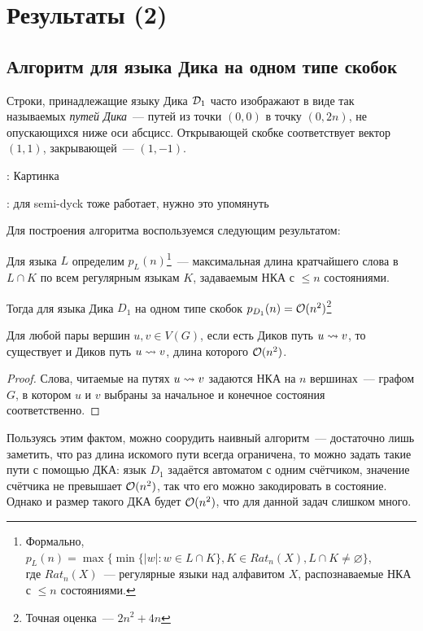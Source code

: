 \section{Результаты (2)}

\subsection{Алгоритм для языка Дика на одном типе скобок}

\begin{note}
  Строки, принадлежащие языку Дика $\mathcal{D}_1$ часто изображают в виде так называемых \textit{путей Дика}~--- путей из точки $(0, 0)$ в точку $(0, 2n)$, не опускающихся ниже оси абсцисс. Открывающей скобке соответствует вектор $(1, 1)$, закрывающей~--- $(1, -1)$.

  \TODO: Картинка 
\end{note}

\TODO: для semi-dyck тоже работает, нужно это упомянуть

Для построения алгоритма воспользуемся следующим результатом:

\begin{lemma}

Для языка $L$ определим $p_L(n)$\footnote{Формально, $p_L(n) = \max \{ \min \{|w| \colon w \in L \cap K \}, K \in Rat_n(X), L \cap K \ne \varnothing \}$,\\ где $Rat_n(X)$~--- регулярные языки над алфавитом $X$, распознаваемые НКА с $\le n$ состояниями.}~--- максимальная длина кратчайшего слова в $L \cap K$ по всем регулярным языкам $K$, задаваемым НКА с $\le n$ состояниями.

Тогда для языка Дика $D_1$ на одном типе скобок $p_{D_1}(n) = \mathcal{O}(n^2)$\footnote{Точная оценка~--- $2n^2 + 4n$}
\end{lemma}

\begin{corollary}
    Для любой пары вершин $u, v \in V(G)$, если есть Диков путь $u \rightsquigarrow v$, то существует и Диков путь $u \rightsquigarrow v$, длина которого $\mathcal{O}(n^2)$.
\end{corollary}
\begin{proof}
    Слова, читаемые на путях $u \rightsquigarrow v$ задаются НКА на $n$ вершинах~--- графом $G$, в котором $u$ и $v$ выбраны за начальное и конечное состояния соответственно.
\end{proof}

\begin{note}
Пользуясь этим фактом, можно соорудить наивный алгоритм~--- достаточно лишь заметить, что раз длина искомого пути всегда ограничена, то можно задать такие пути с помощью ДКА: язык $D_1$ задаётся автоматом с одним счётчиком, значение счётчика не превышает $\mathcal{O}(n^2)$, так что его можно закодировать в состояние. Однако и размер такого ДКА будет $\mathcal{O}(n^2)$, что для данной задач слишком много.
\end{note} 

